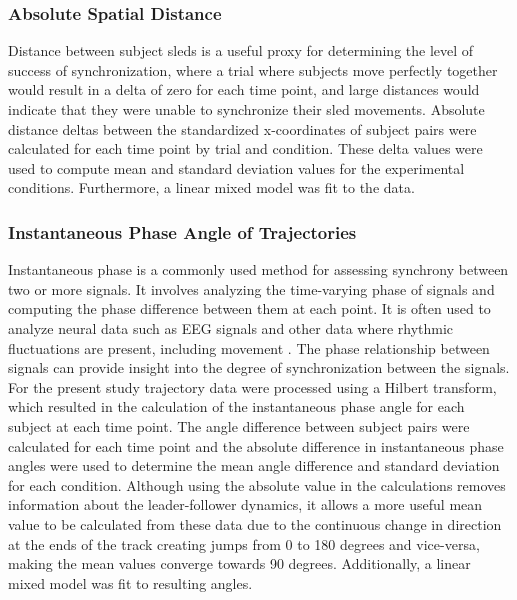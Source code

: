 \documentclass[10pt,a4paper,onecolumn]{article}
\begin{document}
\hypertarget{absolute-spatial-distance}{%
\subsubsection{Absolute Spatial Distance}\label{absolute-spatial-distance}}

Distance between subject sleds is a useful proxy for determining the level of success of synchronization, where a trial where subjects move perfectly together would result in a delta of zero for each time point, and large distances would indicate that they were unable to synchronize their sled movements. Absolute distance deltas between the standardized x-coordinates of subject pairs were calculated for each time point by trial and condition. These delta values were used to compute mean and standard deviation values for the experimental conditions. Furthermore, a linear mixed model was fit to the data.

\hypertarget{instantaneous-phase-angle-of-trajectories}{%
\subsubsection{Instantaneous Phase Angle of Trajectories}\label{instantaneous-phase-angle-of-trajectories}}

Instantaneous phase is a commonly used method for assessing synchrony between two or more signals. It involves analyzing the time-varying phase of signals and computing the phase difference between them at each point. It is often used to analyze neural data such as EEG signals and other data where rhythmic fluctuations are present, including movement \autocite{varletComputationContinuousRelative2011a}. The phase relationship between signals can provide insight into the degree of synchronization between the signals. For the present study trajectory data were processed using a Hilbert transform, which resulted in the calculation of the instantaneous phase angle for each subject at each time point. The angle difference between subject pairs were calculated for each time point and the absolute difference in instantaneous phase angles were used to determine the mean angle difference and standard deviation for each condition. Although using the absolute value in the calculations removes information about the leader-follower dynamics, it allows a more useful mean value to be calculated from these data due to the continuous change in direction at the ends of the track creating jumps from 0 to 180 degrees and vice-versa, making the mean values converge towards 90 degrees. Additionally, a linear mixed model was fit to resulting angles.
\end{document}
